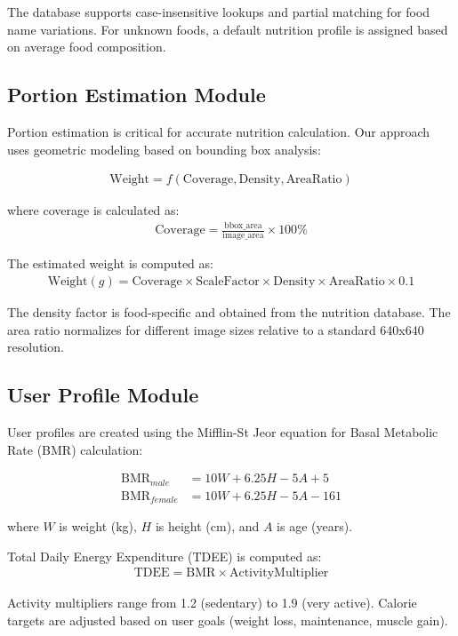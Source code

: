 \documentclass[conference]{IEEEtran}
\begin{document}
The database supports case-insensitive lookups and partial matching for food name variations. For unknown foods, a default nutrition profile is assigned based on average food composition.

\subsection{Portion Estimation Module}
Portion estimation is critical for accurate nutrition calculation. Our approach uses geometric modeling based on bounding box analysis:

\begin{align}
\text{Weight} = f(\text{Coverage}, \text{Density}, \text{AreaRatio})
\end{align}

where coverage is calculated as:
\begin{align}
\text{Coverage} = \frac{\text{bbox\_area}}{\text{image\_area}} \times 100\%
\end{align}

The estimated weight is computed as:
\begin{align}
\text{Weight}(g) = \text{Coverage} \times \text{ScaleFactor} \times \text{Density} \times \text{AreaRatio} \times 0.1
\end{align}

The density factor is food-specific and obtained from the nutrition database. The area ratio normalizes for different image sizes relative to a standard 640x640 resolution.

\subsection{User Profile Module}
User profiles are created using the Mifflin-St Jeor equation for Basal Metabolic Rate (BMR) calculation:

\begin{align}
\text{BMR}_{male} &= 10W + 6.25H - 5A + 5 \\
\text{BMR}_{female} &= 10W + 6.25H - 5A - 161
\end{align}

where $W$ is weight (kg), $H$ is height (cm), and $A$ is age (years).

Total Daily Energy Expenditure (TDEE) is computed as:
\begin{align}
\text{TDEE} = \text{BMR} \times \text{ActivityMultiplier}
\end{align}

Activity multipliers range from 1.2 (sedentary) to 1.9 (very active). Calorie targets are adjusted based on user goals (weight loss, maintenance, muscle gain).
\end{document}
